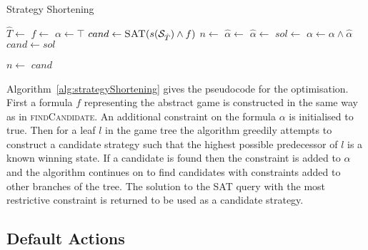 \begin{algorithm}
    \caption{Strategy Shortening}
    \label{alg:strategyShortening}
    \begin{algorithmic}[1]
            \State $\hat{T} \gets $ 
            \State $f \gets $  \EndIfElse
            \State $\alpha \gets \top$
            \State $cand \gets \Call{SAT}{s(\cS_{\hat{T}}) \land f}$
                \State $n \gets $ 
                        \State $\hat{\alpha} \gets $ 
                    \Else
                    \State $\hat{\alpha} \gets $ 
                    \EndIf
                    \State $sol \gets $ 
                    \State $\alpha \gets \alpha \land \hat{\alpha}$
                        \State $cand \gets sol$
                        \Break
                    \EndIf
                        
                    \State $n \gets $ 
                \EndWhile
            \EndFor
            \State \Return $cand$
        \EndFunction
    \end{algorithmic}
\end{algorithm}

Algorithm~\ref{alg:strategyShortening} gives the pseudocode for the optimisation. First a formula $f$ representing the abstract game is constructed in the same way as in \textsc{findCandidate}. An additional constraint on the formula $\alpha$ is initialised to true. Then for a leaf $l$ in the game tree the algorithm greedily attempts to construct a candidate strategy such that the highest possible predecessor of $l$ is a known winning state. If a candidate is found then the constraint is added to $\alpha$ and the algorithm continues on to find candidates with constraints added to other branches of the tree. The solution to the SAT query with the most restrictive constraint is returned to be used as a candidate strategy.

\subsection{Default Actions}


